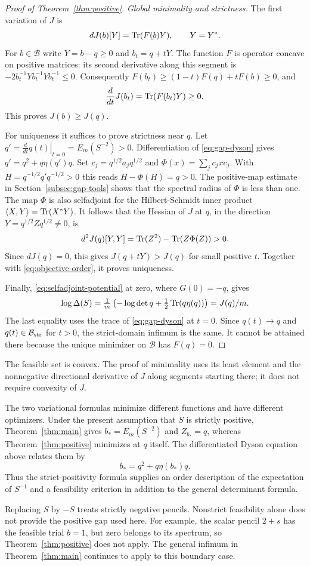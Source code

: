\begin{proof}[Proof of Theorem~\ref{thm:positive}]
\emph{Global minimality and strictness.}
The first variation of $J$ is
\[
 dJ(b)[Y]=\operatorname{Tr}(F(b)Y),\qquad Y=Y^*.
\]
For $b\in\mathcal B$ write $Y=b-q\ge0$ and $b_t=q+tY$.
The function $F$ is operator concave on positive matrices: its second derivative along this segment is $-2b_t^{-1}Yb_t^{-1}Yb_t^{-1}\le0$.
Consequently $F(b_t)\ge(1-t)F(q)+tF(b)\ge0$, and
\begin{equation}\label{eq:objective-order}
 \frac{d}{dt}J(b_t)=\operatorname{Tr}(F(b_t)Y)\ge0.
\end{equation}
This proves $J(b)\ge J(q)$.

For uniqueness it suffices to prove strictness near $q$.
Let $q'=\left.\frac{d}{dt}q(t)\right|_{t=0}=E_m(S^{-2})>0$.
Differentiation of \eqref{eq:gap-dyson} gives $q'=q^2+q\eta(q')q$.
Set $c_j=q^{1/2}a_jq^{1/2}$ and $\Phi(x)=\sum_jc_jxc_j$.
With $H=q^{-1/2}q'q^{-1/2}>0$ this reads $H-\Phi(H)=q>0$.
The positive-map estimate in Section~\ref{subsec:gap-tools} shows that the spectral radius of $\Phi$ is less than one.
The map $\Phi$ is also selfadjoint for the Hilbert-Schmidt inner product $\langle X,Y\rangle=\operatorname{Tr}(X^*Y)$.
It follows that the Hessian of $J$ at $q$, in the direction $Y=q^{1/2}Zq^{1/2}\ne0$, is
\[
 d^2J(q)[Y,Y]=\operatorname{Tr}(Z^2)-\operatorname{Tr}(Z\Phi(Z))>0.
\]
Since $dJ(q)=0$, this gives $J(q+tY)>J(q)$ for small positive $t$.
Together with \eqref{eq:objective-order}, it proves uniqueness.

Finally, \eqref{eq:selfadjoint-potential} at zero, where $G(0)=-q$, gives
\[
 \log\Delta(S)=\tfrac1m\left(-\log\det q
                       +\tfrac12\operatorname{Tr}(q\eta(q))\right)=J(q)/m.
\]
The last equality uses the trace of \eqref{eq:gap-dyson} at $t=0$.
Since $q(t)\to q$ and $q(t)\in\mathcal B_{\rm str}$ for $t>0$, the strict-domain infimum is the same.
It cannot be attained there because the unique minimizer on $\mathcal B$ has $F(q)=0$.
\end{proof}

The feasible set is convex.
The proof of minimality uses its least element and the nonnegative directional derivative of $J$ along segments starting there; it does not require convexity of $J$.


The two variational formulas minimize different functions and have different optimizers.
Under the present assumption that $S$ is strictly positive, Theorem~\ref{thm:main} gives $b_*=E_m(S^{-2})$ and $Z_{b_*}=q$, whereas Theorem~\ref{thm:positive} minimizes at $q$ itself.
The differentiated Dyson equation above relates them by
\begin{equation}\label{eq:optimizer-relation}
 b_*=q^2+q\eta(b_*)q.
\end{equation}
Thus the strict-positivity formula supplies an order description of the expectation of $S^{-1}$ and a feasibility criterion in addition to the general determinant formula.

Replacing $S$ by $-S$ treats strictly negative pencils.
Nonstrict feasibility alone does not provide the positive gap used here.
For example, the scalar pencil $2+s$ has the feasible trial $b=1$, but zero belongs to its spectrum, so Theorem~\ref{thm:positive} does not apply.
The general infimum in Theorem~\ref{thm:main} continues to apply to this boundary case.
